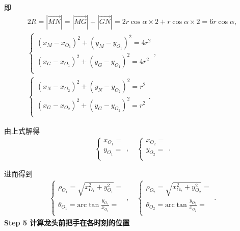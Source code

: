 \documentclass[../main.tex]{subfiles}
\begin{document}
\par 即
\begin{gather}
    2R=\left| \overrightarrow{MN} \right|=\left| \overrightarrow{MG} \right|+\left| \overrightarrow{GN} \right|= 2r\cos\alpha\times2 + r\cos\alpha\times2 = 6r\cos\alpha,
    \\
    \begin{cases}\label{1.........50}
    \left( x_M-x_{O_1} \right) ^2+\left( y_M-y_{O_1} \right) ^2=4r^2\\
    \left( x_G-x_{O_1} \right) ^2+\left( y_G-y_{O_1} \right) ^2=4r^2\\
    \end{cases},
    \\
    \begin{cases}\label{1.........51}
    \left( x_N-x_{O_2} \right) ^2+\left( y_N-y_{O_2} \right) ^2=r^2\\
    \left( x_G-x_{O_2} \right) ^2+\left( y_G-y_{O_2} \right) ^2=r^2\\
    \end{cases}.
    \end{gather}
        \par 由上式解得
        \begin{gather}\label{1.........52}
        \begin{cases}
        x_{O_1}=\\
        y_{O_1}=\\
        \end{cases},\quad \begin{cases}
        x_{O_2}=\\
        y_{O_2}=\\
        \end{cases}.
    \end{gather}
   \par  进而得到
    \begin{gather}\label{1.........53}
    \begin{cases}
    \rho _{O_1}=\sqrt{x_{O_1}^{2}+y_{O_1}^{2}}=\\
    \theta _{O_1}=\mathrm{arc}\tan \frac{y_{O_1}}{x_{O_1}}=\\
    \end{cases},\quad \begin{cases}
    \rho _{O_2}=\sqrt{x_{O_2}^{2}+y_{O_2}^{2}}=\\
    \theta _{O_2}=\mathrm{arc}\tan \frac{y_{O_2}}{x_{O_2}}=\\
    \end{cases}.
    \end{gather}
    \noindent\textbf{Step 5 计算龙头前把手在各时刻的位置} 
    
\end{document}
